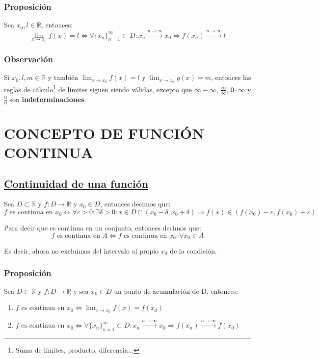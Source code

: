 \documentclass[10pt,a4paper,openright]{book}
\begin{document}
\subsubsection*{Proposición}
Sea $x_0, l\in \overline{\mathbb R}$, entonces:
$$\lim_{x\rightarrow x_0}f(x)=l\Leftrightarrow \forall\{x_n\}_{n=1}^\infty \subset D: x_n\xrightarrow{n\rightarrow \infty} x_0\Rightarrow f(x_n)\xrightarrow{n\rightarrow \infty} l$$

\subsubsection*{Observación}
Si $x_0,l,m\in \overline{\mathbb R}$ y también $\lim_{x\rightarrow x_0}f(x)=l$ y $\lim_{x\rightarrow x_0}g(x)=m$, entonces las reglas de cálculo\footnote{Suma de límites, producto, diferencia...} de límites siguen siendo válidas, excepto que $\infty-\infty$, $\frac{\infty}{\infty}$, $0\cdot \infty$ y $\frac{0}{0}$ son \textbf{indeterminaciones}.

\section*{CONCEPTO DE FUNCIÓN CONTINUA}
\subsection*{\underline{Continuidad de una función}}
Sea $D\subset \mathbb R$ y $f: D\longrightarrow \mathbb R$ y $x_0\in D$, entonces decimos que:
$$f\mbox{ es continua en }x_0 \Leftrightarrow \forall \varepsilon >0 : \exists \delta >0: x\in D\cap (x_0-\delta, x_0+\delta)\Rightarrow f(x)\in (f(x_0)-\varepsilon, f(x_0)+\varepsilon)$$

Para decir que es continua en un conjunto, entonces decimos que:
$$f\mbox{ es continua en }A \Leftrightarrow f\mbox{ es continua en }x_0: \forall x_0 \in A$$

Es decir, ahora no excluimos del intervalo al propio $x_0$ de la condición.

\subsubsection*{Proposición}
Sea $D\subset \mathbb R$ y $f: D\longrightarrow \mathbb R$ y sea $x_0\in D$ un punto de acumulación de D, entonces:
\begin{enumerate}
\item $f\mbox{ es continua en }x_0 \Leftrightarrow \lim_{x\rightarrow x_0} f(x)=f(x_0)$

\item $f\mbox{ es continua en }x_0 \Leftrightarrow \forall \{x_n\}_{n=1}^\infty\subset D: x_n\xrightarrow{n\rightarrow \infty} x_0\Rightarrow f(x_n)\xrightarrow{n\rightarrow \infty} f(x_0)$
\end{enumerate}
\end{document}
